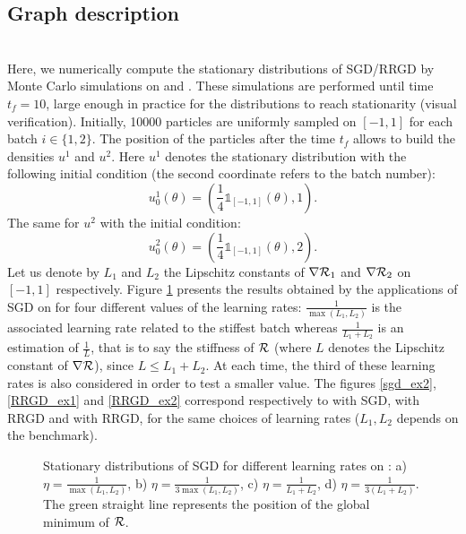 \documentclass[article,authoryear,jmlmc]{beg_32}             %
\begin{document}
\subsection{Graph description}
~~\\
Here, we numerically compute the stationary distributions of SGD/RRGD by Monte Carlo simulations on \exOne and \exTwo. These simulations are performed until time $t_f=10$, large
enough in practice for the distributions to reach stationarity (visual verification). Initially, 10000 particles are uniformly sampled on $[-1,1]$ for each batch $i\in \{1,2\}$.
The position of the particles after the time $t_f$ allows to build the densities $u^1$ and $u^2$. Here $u^1$ denotes the stationary distribution with the following initial condition (the second coordinate refers to the batch number):
\begin{equation*}
	u^1_0(\theta) = \left(\frac{1}{4} \mathds{1}_{[-1,1]}(\theta),1\right).
\end{equation*}
The same for $u^2$ with the initial condition:
\begin{equation*}
	u^2_0(\theta) = \left(\frac{1}{4} \mathds{1}_{[-1,1]}(\theta),2\right).
\end{equation*}
Let us denote by $L_1$ and $L_2$ the Lipschitz constants of $\nabla \mathcal{R}_1$ and $\nabla \mathcal{R}_2$ on $[-1,1]$ respectively. Figure \ref{sgd_ex1} presents the results obtained by the applications of SGD on \exOne
for four different values of the learning rates: $\frac{1}{\max(L_1,L_2)}$ is the associated learning rate related to the stiffest batch whereas $\frac{1}{L_1+L_2}$ is an estimation of
$\frac{1}{L}$, that is to say the stiffness of $\mathcal{R}$ (where $L$ denotes the Lipschitz constant of $\nabla \mathcal{R}$), since $L \leq L_1+L_2$. At each time, the third of these learning rates is also
considered in order to test a smaller value. %
The figures
\ref{sgd_ex2}, \ref{RRGD_ex1} and \ref{RRGD_ex2} correspond respectively to \exTwo with SGD, \exOne with RRGD and \exTwo with RRGD, for the same choices of learning rates ($L_1,L_2$ depends on the benchmark). 

\begin{figure}[!h]
	\centering
	\scalebox{0.60}{}
	\caption{Stationary distributions of SGD for different learning rates on \exOne: a) $\eta=\frac{1}{\max(L_1,L_2)}$, b) $\eta=\frac{1}{3\max(L_1,L_2)}$, c) $\eta=\frac{1}{L_1+L_2}$, d) $\eta=\frac{1}{3(L_1+L_2)}$. The green straight line represents the position of the global minimum of $\mathcal{R}$.}
	\label{sgd_ex1}
\end{figure}
\end{document}
